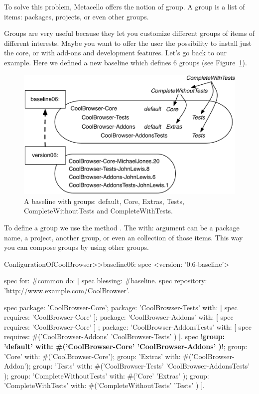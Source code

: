 \documentclass[a4paper,10pt,twoside]{book}
\begin{document}
To solve this problem, Metacello offers the notion of group. A group is a list of items: packages, projects, or even other groups. 
 
Groups are very useful because they let you customize different groups of items of different interests. Maybe you want to offer the  user the possibility to install just the core, or with add-ons and development features. Let's go back to our example. Here we defined a new baseline  which defines 6 groups (see Figure~\ref{fig:version06}). 

\begin{figure}
\begin{center}
\includegraphics[width=0.6\linewidth]{version06}
\caption{A baseline with groups: default, Core, Extras, Tests, CompleteWithoutTests and CompleteWithTests.\label{fig:version06}}
\end{center}
\end{figure} 


To define a group we use the method . The {with:} argument can be a package name, a project, another group, or even an collection of those items. This way you can compose groups by using other groups. 
 
\begin{code}{}
ConfigurationOfCoolBrowser>>baseline06: spec 
	<version: '0.6-baseline'>
	
	spec for: #common do: [
		spec blessing: #baseline.
		spec repository: 'http://www.example.com/CoolBrowser'.
		
		spec 
			package: 'CoolBrowser-Core';
			package: 'CoolBrowser-Tests' with: [ spec requires: 'CoolBrowser-Core' ];
			package: 'CoolBrowser-Addons' with: [ spec requires: 'CoolBrowser-Core' ] ;
			package: 'CoolBrowser-AddonsTests' with: [ 
				spec requires: #('CoolBrowser-Addons' 'CoolBrowser-Tests' ) ].
		spec 
			!\textbf{group: 'default' with: \#('CoolBrowser-Core' 'CoolBrowser-Addons' )}!;
			group: 'Core' with: #('CoolBrowser-Core');
			group: 'Extras' with: #('CoolBrowser-Addon');
			group: 'Tests' with: #('CoolBrowser-Tests' 'CoolBrowser-AddonsTests' );
			group: 'CompleteWithoutTests' with: #('Core' 'Extras' );
			group: 'CompleteWithTests' with: #('CompleteWithoutTests' 'Tests' )
		 ].
\end{code}
\end{document}
